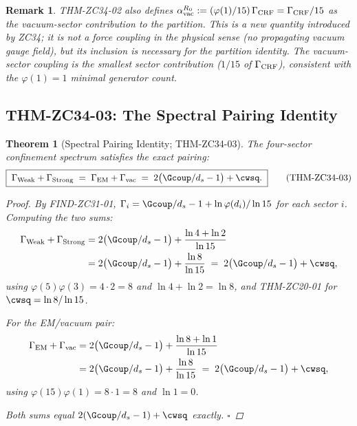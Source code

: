 \documentclass[12pt, a4paper]{article}
\newtheorem{theorem}{Theorem}[section]
\newtheorem{remark}{Remark}[section]
\begin{document}
\begin{remark}
THM-ZC34-02 also defines $\alpha_{\rm vac}^{R_0} :=
(\varphi(1)/15)\,\Gamma_{\rm CRF} = \Gamma_{\rm CRF}/15$ as the
vacuum-sector contribution to the partition. This is a new
quantity introduced by ZC34; it is not a force coupling in
the physical sense (no propagating vacuum gauge field), but
its inclusion is necessary for the partition identity. The
vacuum-sector coupling is the smallest sector contribution
($1/15$ of $\Gamma_{\rm CRF}$), consistent with the
$\varphi(1) = 1$ minimal generator count.
\end{remark}

\subsection{THM-ZC34-03: The Spectral Pairing Identity}
\label{sec:thm-03}

\begin{theorem}[Spectral Pairing Identity; THM-ZC34-03]
\label{thm:zc34-03}
The four-sector confinement spectrum satisfies the exact
pairing:
\begin{equation}
  \boxed{\;\Gamma_{\rm Weak} + \Gamma_{\rm Strong}
    \;=\; \Gamma_{\rm EM} + \Gamma_{\rm vac}
    \;=\; 2\bigl(\Gcoup/d_s - 1\bigr) + \cwsq.\;}
  \tag{THM-ZC34-03}\label{eq:thm-zc34-03}
\end{equation}

\begin{proof}
By FIND-ZC31-01, $\Gamma_i = \Gcoup/d_s - 1 + \ln\varphi(d_i)/\ln 15$
for each sector $i$. Computing the two sums:
\begin{align*}
  \Gamma_{\rm Weak} + \Gamma_{\rm Strong}
    &= 2\bigl(\Gcoup/d_s - 1\bigr) + \frac{\ln 4 + \ln 2}{\ln 15}\\
    &= 2\bigl(\Gcoup/d_s - 1\bigr) + \frac{\ln 8}{\ln 15}
    \;=\; 2\bigl(\Gcoup/d_s - 1\bigr) + \cwsq,
\end{align*}
using $\varphi(5)\varphi(3) = 4 \cdot 2 = 8$ and
$\ln 4 + \ln 2 = \ln 8$, and THM-ZC20-01 for $\cwsq = \ln 8/\ln 15$.

\medskip
For the EM/vacuum pair:
\begin{align*}
  \Gamma_{\rm EM} + \Gamma_{\rm vac}
    &= 2\bigl(\Gcoup/d_s - 1\bigr) + \frac{\ln 8 + \ln 1}{\ln 15}\\
    &= 2\bigl(\Gcoup/d_s - 1\bigr) + \frac{\ln 8}{\ln 15}
    \;=\; 2\bigl(\Gcoup/d_s - 1\bigr) + \cwsq,
\end{align*}
using $\varphi(15)\varphi(1) = 8 \cdot 1 = 8$ and $\ln 1 = 0$.

\medskip
Both sums equal $2(\Gcoup/d_s - 1) + \cwsq$ exactly.
\hfill$\square$
\end{proof}
\end{theorem}
\end{document}
